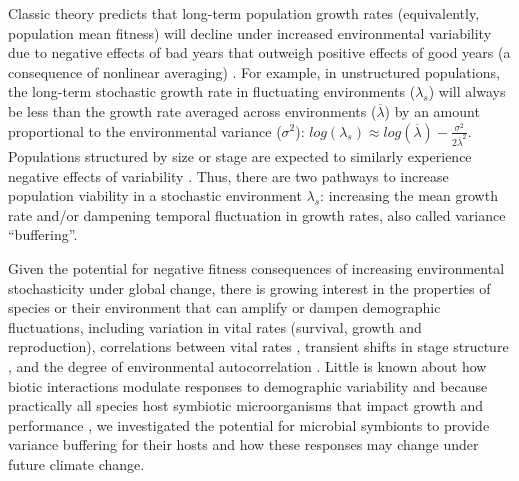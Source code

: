 \documentclass[12pt]{article}
\begin{document}
Classic theory predicts that long-term population growth rates (equivalently, population mean fitness) will decline under increased environmental variability due to negative effects of bad years that outweigh positive effects of good years (a consequence of nonlinear averaging) \cite{lewontin_population_1969,tuljapurkar_population_1982}.
For example, in unstructured populations, the long-term stochastic growth rate in fluctuating environments ($\lambda_s$) will always be less than the growth rate averaged across environments ($\overline{\lambda}$) by an amount proportional to the environmental variance ($\sigma^2$): $ log(\lambda_s)  \approx log(\overline{\lambda}) - \frac{\sigma^2}{2\overline{\lambda}^2}$.
Populations structured by size or stage are expected to similarly experience negative effects of variability \cite{cohen1979comparative, tuljapurkar2013population}.
Thus, there are two pathways to increase population viability in a stochastic environment $\lambda_s$: increasing the mean growth rate and/or dampening temporal fluctuation in growth rates, also called variance ``buffering''.

Given the potential for negative fitness consequences of increasing environmental stochasticity under global change, there is growing interest in the properties of species or their environment that can amplify or dampen demographic fluctuations, including variation in vital rates (survival, growth and reproduction)\cite{morris2008longevity}, correlations between vital rates \cite{compagnoni2016effect}, transient shifts in stage structure \cite{ellis2013role}, and the degree of environmental autocorrelation \cite{tuljapurkar1980population, fieberg2001stochastic}. 
Little is known about how biotic interactions modulate responses to demographic variability \cite{hilde_demographic_2020} and because practically all species host symbiotic microorganisms that impact growth and performance \cite{rodriguez2009fungal, mcfall2013animals}, we investigated the potential for microbial symbionts to provide variance buffering for their hosts and how these responses may change under future climate change.
\end{document}
